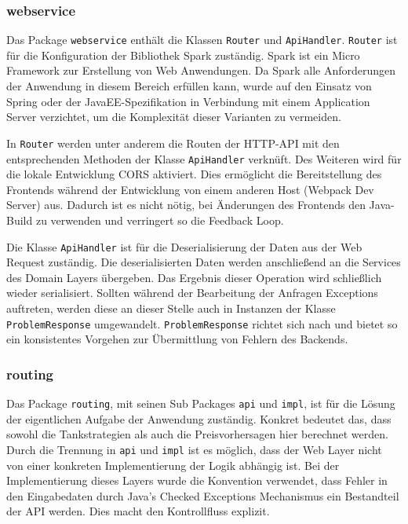 \documentclass[
ngerman          %
,a4paper          %
,11pt
,pdftex
]{report}
\begin{document}
\subsubsection{webservice}
\label{sec:webservice}

Das Package \texttt{webservice} enthält die Klassen \texttt{Router} und \texttt{ApiHandler}. \texttt{Router} ist für die Konfiguration der Bibliothek Spark zuständig. Spark ist ein Micro Framework zur Erstellung von Web Anwendungen. Da Spark alle Anforderungen der Anwendung in diesem Bereich erfüllen kann, wurde auf den Einsatz von Spring oder der JavaEE-Spezifikation in Verbindung mit einem Application Server verzichtet, um die Komplexität dieser Varianten zu vermeiden.

In \texttt{Router} werden unter anderem die Routen der \ac{HTTP}-\ac{API} mit den entsprechenden Methoden der Klasse \texttt{ApiHandler} verknüft. Des Weiteren wird für die lokale Entwicklung \ac{CORS} aktiviert. Dies ermöglicht die Bereitstellung des Frontends während der Entwicklung von einem anderen Host (Webpack Dev Server) aus. Dadurch ist es nicht nötig, bei Änderungen des Frontends den Java-Build zu verwenden und verringert so die Feedback Loop.

Die Klasse \texttt{ApiHandler} ist für die Deserialisierung der Daten aus der Web Request zuständig. Die deserialisierten Daten werden anschließend an die Services des Domain Layers übergeben. Das Ergebnis dieser Operation wird schließlich wieder serialisiert. Sollten während der Bearbeitung der Anfragen Exceptions auftreten, werden diese an dieser Stelle auch in Instanzen der Klasse \texttt{ProblemResponse} umgewandelt. \texttt{ProblemResponse} richtet sich nach \cite{nottingham} und bietet so ein konsistentes Vorgehen zur Übermittlung von Fehlern des Backends.

\subsubsection{routing}
\label{sec:routing}

Das Package \texttt{routing}, mit seinen Sub Packages \texttt{api} und \texttt{impl}, ist für die Lösung der eigentlichen Aufgabe der Anwendung zuständig. Konkret bedeutet das, dass sowohl die Tankstrategien als auch die Preisvorhersagen hier berechnet werden. Durch die Trennung in \texttt{api} und \texttt{impl} ist es möglich, dass der Web Layer nicht von einer konkreten Implementierung der Logik abhängig ist. Bei der Implementierung dieses Layers wurde die Konvention verwendet, dass Fehler in den Eingabedaten durch Java's Checked Exceptions Mechanismus ein Bestandteil der \ac{API} werden. Dies macht den Kontrollfluss explizit.
\end{document}
